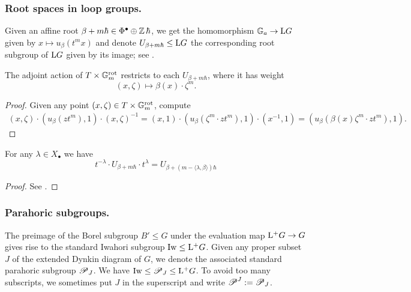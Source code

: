 \subsubsection{Root spaces in loop groups.}\label{paragraph: root spaces in loop groups}
Given an affine root $\beta + m\hbar \in \Phi^{\bullet} \oplus \operatorname{\mathbb{Z}} \hbar$, we get the homomorphism $\mathbb{G}_a \to \mathrm{L} G$ given by $x \mapsto u_\beta(t^mx)$ and denote $U_{\beta + m\hbar} \leq \mathrm{L} G$ the corresponding root subgroup of $\mathrm{L} G$ given by its image; see \cite[\S 4.3]{RW22}.

\begin{lemma}\label{lemma: weights of extended torus on affine root groups}
The adjoint action of $T \times \mathbb{G}_m^{\mathrm{rot}}$ restricts to each $U_{\beta + m\hbar}$, where it has weight
\begin{equation*}
(x, \zeta) \mapsto \beta(x) \cdot \zeta^m.  
\end{equation*}
\end{lemma}
\begin{proof}
Given any point $(x, \zeta) \in T \times \mathbb{G}_m^{\mathrm{rot}}$, compute
\begin{align*}
   (x, \zeta) \cdot (u_{\beta}(z t^m), 1) \cdot (x, \zeta)^{-1} 
   = (x, 1) \cdot (u_{\beta}(\zeta^m \cdot zt^m), 1) \cdot (x^{-1}, 1)
   = (u_{\beta}(\beta(x) \zeta^m \cdot z t^m), 1).
\end{align*}
\end{proof}

\begin{lemma}\label{lemma: conjugation of affine root spaces}
For any $\lambda \in X_{\bullet}$ we have 
\begin{equation*}
 t^{-\lambda} \cdot U_{\beta + m\hbar} \cdot t^{\lambda} = U_{\beta + (m- \langle \lambda, \beta \rangle)\hbar}
\end{equation*}
\end{lemma}
\begin{proof}
    See \cite[Lemma 4.3. (2)]{RW22}.
\end{proof}





\subsubsection{Parahoric subgroups.}\label{subsubsection: parahoric subgroups}
The preimage of the Borel subgroup $B' \leq G$ under the evaluation map $\mathrm{L^+} G \to G$ gives rise to the standard Iwahori subgroup $\operatorname{\mathrm{Iw}} \leq \mathrm{L^+} G$. Given any proper subset $J$ of the extended Dynkin diagram of $G$, we denote the associated standard parahoric subgroup $\operatorname{\mathscr{P}}_J$. We have $\operatorname{\mathrm{Iw}} \leq \operatorname{\mathscr{P}}_J \leq \mathrm{L^+} G$. To avoid too many subscripts, we sometimes put $J$ in the superscript and write $\operatorname{\mathscr{P}}^J := \operatorname{\mathscr{P}}_J$.

